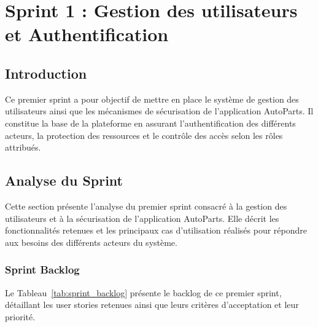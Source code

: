 \chapter{Sprint 1 : Gestion des utilisateurs et Authentification }
\localtableofcontents
\newpage
\section{Introduction}

Ce premier sprint a pour objectif de mettre en place le système de gestion des utilisateurs ainsi que les mécanismes de sécurisation de l'application AutoParts. 
Il constitue la base de la plateforme en assurant l'authentification des différents acteurs, la protection des ressources et le contrôle des accès selon les rôles attribués.


\section{Analyse du Sprint}

Cette section présente l'analyse du premier sprint consacré à la gestion des utilisateurs et à la sécurisation de l'application AutoParts. Elle décrit les fonctionnalités retenues et les principaux cas d'utilisation réalisés pour répondre aux besoins des différents acteurs du système.

\subsection*{Sprint Backlog}

Le Tableau~\ref{tab:sprint_backlog} présente le backlog de ce premier sprint, détaillant les user stories retenues ainsi que leurs critères d'acceptation et leur priorité.

